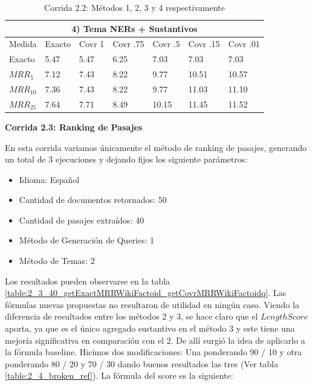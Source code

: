 \begin{table}
\begin{center}
\medskip

\begin{tabular}{|l | l | l | l | l | l | l |}
\hline
\multicolumn{7}{|c|}{4) Tema NERs + Sustantivos}  \\ \hline
Medida & Exacto & Covr 1 & Covr .75 & Covr .5 & Covr .15 & Covr .01 \\ \hline
Exacto & 5.47 & 5.47 & 6.25 & 7.03 & 7.03 & 7.03  \\ \hline
$MRR_{5}$ & 7.12 & 7.43 & 8.22 & 9.77 & 10.51 & 10.57  \\ \hline
$MRR_{10}$ & 7.36 & 7.43 & 8.22 & 9.77 & 11.03 & 11.10  \\ \hline
$MRR_{25}$ & 7.64 & 7.71 & 8.49 & 10.15 & 11.45 & 11.52  \\ \hline
\end{tabular}


\caption{Corrida 2.2: Métodos 1, 2, 3 y 4 respectivamente}
\label{table:2_2_40_getExactMRRWikiFactoid_getCovrMRRWikiFactoidy}
\end{center}
\end{table}


\textbf{Corrida 2.3: Ranking de Pasajes}\newline

En esta corrida variamos únicamente el método de ranking de pasajes, generando un total de 3 ejecuciones y dejando fijos los siguiente parámetros:


\begin{itemize}
  \item Idioma: Español
  \item Cantidad de documentos retornados: 50
  \item Cantidad de pasajes extraídos: 40
  \item Método de Generación de Queries: 1
  \item Método de Temas: 2
\end{itemize}

Los resultados pueden observarse en la tabla \ref{table:2_3_40_getExactMRRWikiFactoid_getCovrMRRWikiFactoidq}. Las fórmulas nuevas propuestas no resultaron de utilidad en ningún caso. Viendo la diferencia de resultados entre los métodos 2 y 3, se hace claro que el $LengthScore$ aporta, ya que es el único agregado sustantivo en el método 3 y este tiene una mejoría significativa en comparación con el 2. De allí surgió la idea de aplicarlo a la fórmula baseline.
Hicimos dos modificaciones: Una ponderando 90 / 10 y otra ponderando 80 / 20 y 70 / 30 dando buenos resultados las tres (Ver tabla \ref{table:2_4_broken_ref}).
La fórmula del score es la siguiente:

